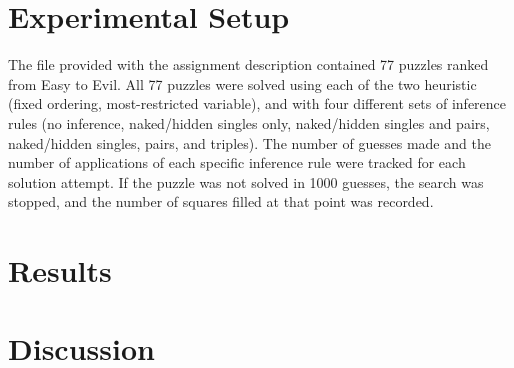 \documentclass{article}
\begin{document}
\section{Experimental Setup}
The file provided with the assignment description contained 77 puzzles ranked from Easy to Evil. All 77 puzzles were solved using each of the two heuristic (fixed ordering, most-restricted variable), and with four different sets of inference rules (no inference, naked/hidden singles only, naked/hidden singles and pairs, naked/hidden singles, pairs, and triples). The number of guesses made and the number of applications of each specific inference rule were tracked for each solution attempt. If the puzzle was not solved in 1000 guesses, the search was stopped, and the number of squares filled at that point was recorded.

\section{Results}

\section{Discussion}
\end{document}
